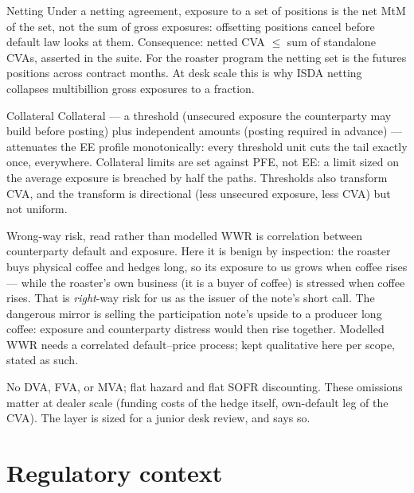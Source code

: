 \documentclass[11pt,a4paper]{article}
\begin{document}
\begin{concept}{Netting}
Under a netting agreement, exposure to a set of positions is the net MtM
of the set, not the sum of gross exposures: offsetting positions cancel
before default law looks at them. Consequence: netted CVA
$\leq$ sum of standalone CVAs, asserted in the suite. For the roaster
program the netting set is the futures positions across contract months.
At desk scale this is why ISDA netting collapses multibillion gross
exposures to a fraction.
\end{concept}

\begin{concept}{Collateral}
Collateral --- a threshold (unsecured exposure the counterparty may build
before posting) plus independent amounts (posting required in advance)
--- attenuates the EE profile monotonically: every threshold unit cuts
the tail exactly once, everywhere. Collateral limits are set against
PFE, not EE: a limit sized on the average exposure is breached by
half the paths. Thresholds also transform CVA, and the transform is
directional (less unsecured exposure, less CVA) but not uniform.
\end{concept}

\begin{concept}{Wrong-way risk, read rather than modelled}
WWR is correlation between counterparty default and exposure. Here it is
benign by inspection: the roaster buys physical coffee and hedges long,
so its exposure to us grows when coffee rises --- while the roaster's own
business (it is a buyer of coffee) is stressed when coffee rises. That is
\emph{right}-way risk for us as the issuer of the note's short call. The
dangerous mirror is selling the participation note's upside to a producer
long coffee: exposure and counterparty distress would then rise
together. Modelled WWR needs a correlated default--price process; kept
qualitative here per scope, stated as such.
\end{concept}

\begin{pitfall}
No DVA, FVA, or MVA; flat hazard and flat SOFR discounting. These
omissions matter at dealer scale (funding costs of the hedge itself,
own-default leg of the CVA). The layer is sized for a junior desk
review, and says so.
\end{pitfall}

\section{Regulatory context}
\label{sec:regulatory}
\end{document}
